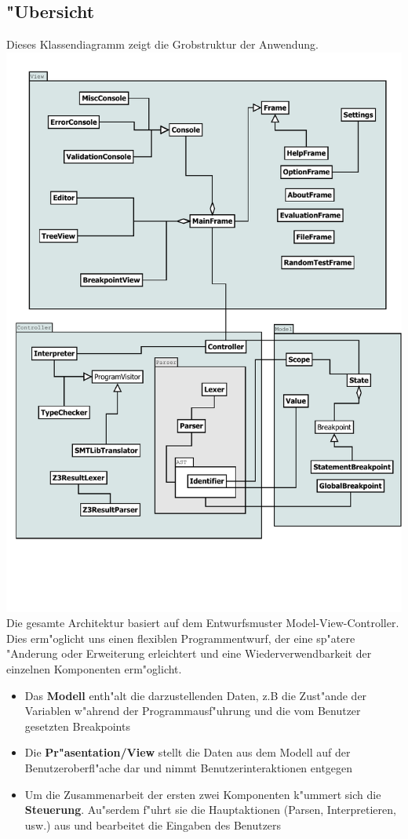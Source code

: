 \documentclass[10pt,a4paper,titlepage]{article}
\begin{document}
\subsection{"Ubersicht}
Dieses Klassendiagramm zeigt die Grobstruktur der Anwendung. \\
\includegraphics[scale=0.8]{images/ClassOverview.pdf} \\
Die gesamte Architektur basiert auf dem Entwurfsmuster Model-View-Controller. Dies erm"oglicht uns einen flexiblen Programmentwurf, der eine sp"atere "Anderung oder Erweiterung erleichtert und eine Wiederverwendbarkeit der einzelnen Komponenten erm"oglicht.
\begin{itemize}
\item Das \textbf{Modell} enth"alt die darzustellenden Daten, z.B die Zust"ande der Variablen w"ahrend der Programmausf"uhrung und die vom Benutzer gesetzten Breakpoints
\item Die \textbf{Pr"asentation/View} stellt die Daten aus dem Modell auf der Benutzeroberfl"ache dar und nimmt Benutzerinteraktionen entgegen
\item Um die Zusammenarbeit der ersten zwei Komponenten k"ummert sich die \textbf{Steuerung}. Au"serdem f"uhrt sie die Hauptaktionen (Parsen, Interpretieren, usw.) aus und bearbeitet die Eingaben des Benutzers \\\\
\end{itemize}
\end{document}
